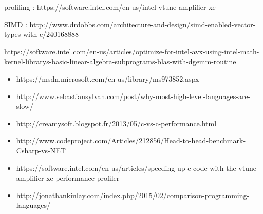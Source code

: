 \newpage

profiling :
https://software.intel.com/en-us/intel-vtune-amplifier-xe


SIMD :
http://www.drdobbs.com/architecture-and-design/simd-enabled-vector-types-with-c/240168888

https://software.intel.com/en-us/articles/optimize-for-intel-avx-using-intel-math-kernel-librarys-basic-linear-algebra-subprograms-blas-with-dgemm-routine

\begin{itemize}
\item https://msdn.microsoft.com/en-us/library/ms973852.aspx
\item http://www.sebastiansylvan.com/post/why-most-high-level-languages-are-slow/
\item http://creamysoft.blogspot.fr/2013/05/c-vs-c-performance.html
\item http://www.codeproject.com/Articles/212856/Head-to-head-benchmark-Csharp-vs-NET
\item https://software.intel.com/en-us/articles/speeding-up-c-code-with-the-vtune-amplifier-xe-performance-profiler
\item http://jonathankinlay.com/index.php/2015/02/comparison-programming-languages/
\end{itemize}








